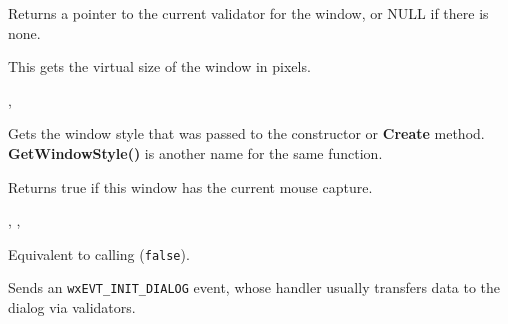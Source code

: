 Returns a pointer to the current validator for the window, or NULL if there is none.

\label{wxwindowgetvirtualsize}



This gets the virtual size of the window in pixels.




,\rtfsp
{}

\label{wxwindowgetwindowstyleflag}


Gets the window style that was passed to the constructor or {\bf Create}
method. {\bf GetWindowStyle()} is another name for the same function.

\label{wxwindowhascapture}


Returns true if this window has the current mouse capture.


, 
, 

\label{wxwindowhide}


Equivalent to calling ({\tt false}).

\label{wxwindowinitdialog}


Sends an {\tt wxEVT\_INIT\_DIALOG} event, whose handler usually transfers data
to the dialog via validators.

\label{wxwindowisenabled}


